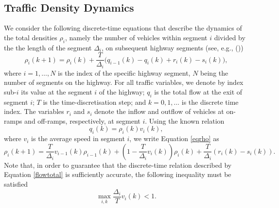 \documentclass[titlepage,oneside,fleqn,12pt]{article}
\newcommand{\trbnum}[1]{{\it \citenum{#1}}}
\begin{document}
\subsection{Traffic Density Dynamics} \label{sec:model}
We consider the following discrete-time equations that describe the dynamics of the total densities $\rho_i$, namely the number of vehicles within segment $i$ divided by the the length of the segment $\Delta_i$, on subsequent highway segments (see, e.g., (\trbnum{Papageorgiou1990a}))
\begin{equation}\label{eqrho}
\rho_i(k+1) = \rho_i(k)+\frac{T}{\Delta_i}\big(q_{i-1}(k)-q_i(k)+r_i(k)-s_i(k)\big),
\end{equation}
where $i=1,\ldots,N$ is the index of the specific highway segment, $N$ being the number of segments on the highway. For all traffic variables, we denote by index sub-$i$ its value at the segment $i$ of the highway; $q_i$ is the total flow at the exit of segment $i$; $T$ is the time-discretisation step; and $k=0,1,\ldots$ is the discrete time index. The variables $r_i$ and $s_i$ denote the inflow and outflow of vehicles at on-ramps and off-ramps, respectively, at segment $i$. Using the known relation
\begin{equation}\label{flowtotal}
q_i(k) = \rho_i(k) v_i(k),
\end{equation}
where $v_i$ is the average speed in segment $i$, we write Equation \ref{eqrho} as
\begin{equation}\label{eqrh1}
\rho_i(k+1) = \frac{T}{\Delta_i}v_{i-1}(k)\rho_{i-1}(k)+\left(1-\frac{T}{\Delta_i}v_i(k)\right)\rho_i(k)+\frac{T}{\Delta_i}\left(r_i(k)-s_i(k)\right).
\end{equation}
Note that, in order to guarantee that the discrete-time relation described by Equation \ref{flowtotal} is sufficiently accurate, the following inequality must be satisfied
\begin{equation}\label{eqStab}
\max_{i,k} \frac{\Delta_i}{T} v_{i}(k) < 1.
\end{equation}
\end{document}

